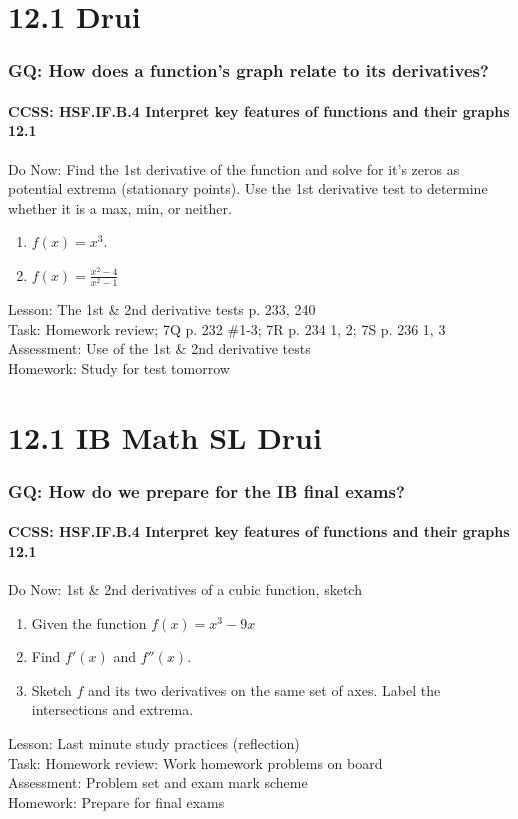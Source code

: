\documentclass{beamer}
\begin{document}
  \section{12.1 Drui}
  \frame
  {
    \frametitle{GQ: How does a function's graph relate to its derivatives?}
    \framesubtitle{CCSS: HSF.IF.B.4 Interpret key features of functions and their graphs \qquad \alert{12.1}}

    \begin{block}{Do Now: Find the 1st derivative of the function and solve for it's zeros as potential extrema (stationary points). Use the 1st derivative test to determine whether it is a max, min, or neither.}
    \begin{enumerate}
        \item $f(x)=x^3$.
        \item $\displaystyle f(x)=\frac{x^2-4}{x^2-1}$
    \end{enumerate}
    \end{block}
    Lesson: The 1st \& 2nd derivative tests p. 233, 240\\%
    Task: Homework review; 7Q p. 232 \#1-3; 7R p. 234 1, 2; 7S p. 236 1, 3 \\%
    Assessment: Use of the 1st \& 2nd derivative tests
    \\%
    Homework: Study for test \alert{tomorrow}
  }

  \section{12.1 IB Math SL Drui}
  \frame
  {
    \frametitle{GQ: How do we prepare for the IB final exams?}
    \framesubtitle{CCSS: HSF.IF.B.4 Interpret key features of functions and their graphs \qquad \alert{12.1}}

    \begin{block}{Do Now: 1st \& 2nd derivatives of a cubic function, sketch}
      \begin{enumerate}
      \item Given the function $f(x)=x^3-9x$
      \item Find $f'(x)$ and $f''(x)$.
      \item Sketch $f$ and its two derivatives on the same set of axes. Label the intersections and extrema.
      \end{enumerate}
   \end{block}
    Lesson: Last minute study practices (reflection) \\[5pt]
    Task: Homework review: Work homework problems on board\\%
    Assessment: Problem set and exam mark scheme\\%
    Homework: Prepare for final exams
  }
\end{document}
